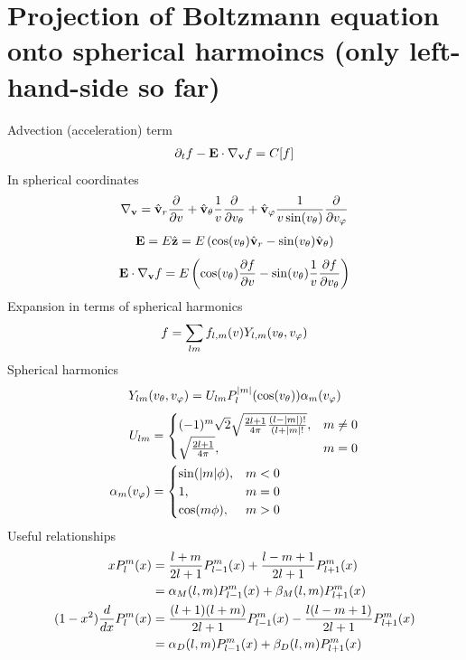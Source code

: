 \documentclass{article}[draft]
\begin{document}
\section{Projection of Boltzmann equation onto spherical harmoincs (only left-hand-side so far)}
Advection (acceleration) term
\begin{align*}
\partial_t f - \mathbf{E}\cdot \nabla_{\mathbf{v}} f = C[f]
\end{align*}
In spherical coordinates
\begin{align*}
\nabla_{\vect{v}} 
= \vrunit \frac{\partial}{\partial \vr}
+ \vthetaunit \frac{1}{\vr} \frac{\partial}{\partial \vtheta}
+ \vphiunit \frac{1}{\vr \sin\of{\vtheta}} \frac{\partial}{\partial \vphi}
\end{align*}
\begin{align*}
\vect{E} 
= E \hat{\vect{z}} 
= E \left( \cos\of{\vtheta} \vrunit - \sin\of{\vtheta} \vthetaunit \right)
\end{align*}
\begin{align*}
\vect{E}\cdot \nabla_{\vect{v}} f
= E 
\left( \cos\of{\vtheta} \frac{\partial f}{\partial \vr} 
- \sin\of{\vtheta} \frac{1}{\vr} \frac{\partial f}{\partial \vtheta} \right)
\end{align*}
Expansion in terms of spherical harmonics
\begin{align*}
f = 
\sum_{lm} f_{l,m}\of{\vr} Y_{l,m}\of{\vtheta,\vphi}
\end{align*}
Spherical harmonics
\begin{align*}
Y_{lm}\of{\vtheta,\vphi} = U_{lm} P^{|m|}_l\of{\cos\of{\vtheta}} \alpha_m\of{\vphi}
\end{align*}
\begin{align*}
U_{lm} &= 
\begin{cases}
(-1)^m \sqrt{2} \sqrt{\frac{2l+1}{4\pi} \frac{(l-|m|)!}{(l+|m|!}}, &m\neq 0 \\
\sqrt{\frac{2l+1}{4\pi}}, &m = 0
\end{cases}
\\
\alpha_m\of{\vphi}
&=
\begin{cases}
\sin\of{|m|\phi}, &m < 0 \\
1, &m = 0\\
\cos\of{m\phi}, &m > 0
\end{cases}
\end{align*}
Useful relationships
\begin{align*}
x P^m_l\of{x} 
&= \frac{l+m}{2l+1} P^m_{l-1}\of{x}
+ \frac{l-m+1}{2l+1} P^m_{l+1}\of{x}
\\
&= \alpha_M\of{l,m} P^m_{l-1}\of{x}
+ \beta_M\of{l,m} P^m_{l+1}\of{x}
\\
(1-x^2) \frac{d}{dx} P^m_l\of{x} 
&= \frac{(l+1)(l+m)}{2l+1} P^m_{l-1}\of{x} 
- \frac{l(l-m+1)}{2l+1} P^m_{l+1}\of{x}
\\
&= \alpha_D\of{l,m} P^m_{l-1}\of{x} 
+ \beta_D\of{l,m} P^m_{l+1}\of{x}
\end{align*}
\end{document}

